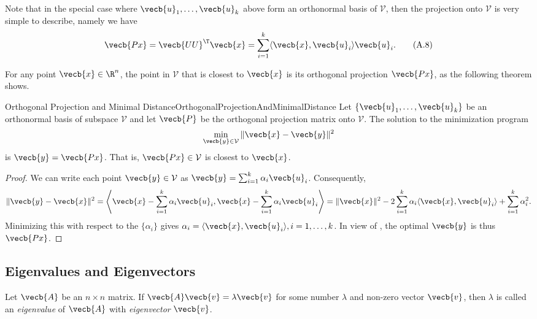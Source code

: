 Note that in the special case where $\vecb{u}_1, \dots, \vecb{u}_k$ above form an orthonormal basis of $\mathcal{V}$, then the projection onto $\mathcal{V}$ is very simple to describe, namely we have
\begin{equation}
	\vecb{Px} = \vecb{U U}^\T \vecb{x} = \sum_{i=1}^k \langle \vecb{x}, \vecb{u}_i \rangle \vecb{u}_i. \tag{A.8}
	\label{eq:OrthonormalProjectionSum}
\end{equation}

For any point $\vecb{x} \in \R^n$, the point in $\mathcal{V}$ that is closest to $\vecb{x}$ is its orthogonal projection $\vecb{Px}$, as the following theorem shows.

\begin{thm}{Orthogonal Projection and Minimal Distance}{OrthogonalProjectionAndMinimalDistance}
	Let $\{\vecb{u}_1, \dots, \vecb{u}_k\}$ be an orthonormal basis of subspace $\mathcal{V}$ and let $\vecb{P}$ be the orthogonal projection matrix onto $\mathcal{V}$. The solution to the minimization program
	\begin{equation*}
		\min_{\vecb{y} \in \mathcal{V}} \|\vecb{x} - \vecb{y}\|^2
	\end{equation*}
	is $\vecb{y} = \vecb{Px}$. That is, $\vecb{Px} \in \mathcal{V}$ is closest to $\vecb{x}$.
\end{thm}

\begin{proof}
	We can write each point $\vecb{y} \in \mathcal{V}$ as $\vecb{y} = \sum_{i=1}^k \alpha_i \vecb{u}_i$. Consequently,
	\begin{equation*}
		\|\vecb{y} - \vecb{x}\|^2 = \left\langle \vecb{x} - \sum_{i=1}^k \alpha_i \vecb{u}_i, \vecb{x} - \sum_{i=1}^k \alpha_i \vecb{u}_i \right\rangle = \|\vecb{x}\|^2 - 2 \sum_{i=1}^k \alpha_i \langle \vecb{x}, \vecb{u}_i \rangle + \sum_{i=1}^k \alpha_i^2.
	\end{equation*}
	Minimizing this with respect to the $\{\alpha_i\}$ gives $\alpha_i = \langle \vecb{x}, \vecb{u}_i \rangle, i = 1, \dots, k$. In view of , the optimal $\vecb{y}$ is thus $\vecb{Px}$.
\end{proof}

\subsection{Eigenvalues and Eigenvectors}
Let $\vecb{A}$ be an $n \times n$ matrix. If $\vecb{A}\vecb{v} = \lambda \vecb{v}$ for some number $\lambda$ and non-zero vector $\vecb{v}$, then $\lambda$ is called an \textit{eigenvalue} of $\vecb{A}$ with \textit{eigenvector} $\vecb{v}$.

